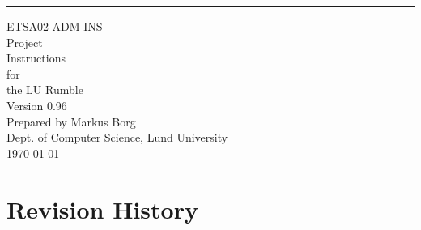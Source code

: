 \documentclass{scrreprt}
\date{}
\def\myversion{0.96 }
\begin{document}
\begin{flushright}
    \rule{16cm}{5pt}\vskip1cm
    \begin{bfseries}
    	\LARGE{ETSA02-ADM-INS}\\
    	\vspace{1.5cm}
        \Huge{Project\\ Instructions}\\
        \vspace{0.5cm}
        for\\
        \vspace{0.5cm}
        the LU Rumble\\
        \vspace{1.5cm}
        \LARGE{Version \myversion}\\ %
        \vspace{1.5cm}
        Prepared by Markus Borg\\
        Dept. of Computer Science, Lund University\\
        \vspace{1.5cm}
        \today\\
    \end{bfseries}
\end{flushright}


\tableofcontents

\chapter*{Revision History}
\end{document}
